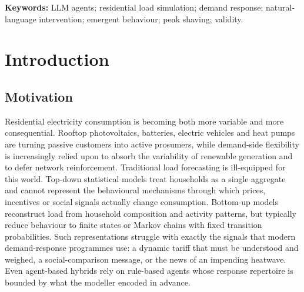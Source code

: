 \documentclass[11pt]{article}
\begin{document}
\begin{abstract}
bounded by appliance substitutability: a device-targeted intervention shaves the total peak only for
non-substitutable devices (air-conditioning) and not for substitutable ones (induction cooking, which the
agent relocates to the oven and microwave). An adversarial self-audit withdraws one previously claimed
peak-shaving result that does not survive a shared-timeline replication, shows that all headline
$p$-values survive Benjamini--Hochberg correction, and classifies each finding as robust, prompt-sensitive
or withdrawn. We conclude by arguing that the calibrated capability boundary of LLM-driven energy
simulation --- not any single effect size --- is the contribution that makes it trustworthy as a
policy-experiment instrument.
\end{abstract}

\noindent\textbf{Keywords:} LLM agents; residential load simulation; demand response; natural-language
intervention; emergent behaviour; peak shaving; validity.

\section{Introduction}

\subsection{Motivation}
Residential electricity consumption is becoming both more variable and more consequential. Rooftop
photovoltaics, batteries, electric vehicles and heat pumps are turning passive customers into active
prosumers, while demand-side flexibility is increasingly relied upon to absorb the variability of
renewable generation and to defer network reinforcement. Traditional load forecasting is ill-equipped for
this world. Top-down statistical models treat households as a single aggregate and cannot represent the
behavioural mechanisms through which prices, incentives or social signals actually change consumption.
Bottom-up models \cite{capasso1994,widen2010,richardson2010} reconstruct load from household composition
and activity patterns, but typically reduce behaviour to finite states or Markov chains with fixed
transition probabilities. Such representations struggle with exactly the signals that modern
demand-response programmes use: a dynamic tariff that must be understood and weighed, a social-comparison
message, or the news of an impending heatwave. Even agent-based hybrids \cite{xu2026} rely on rule-based
agents whose response repertoire is bounded by what the modeller encoded in advance.
\end{document}
